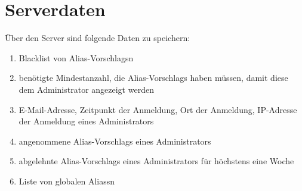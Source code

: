 \section{Serverdaten}

Über den Server sind folgende Daten zu speichern:
\begin{enumerate}[label=\textbf{/D\arabic*0/}, align=left]
	\setcounter{enumi}{\value{user_data_end}}
	\item Blacklist von \Glspl{Alias-Vorschlag}n
	\item benötigte Mindestanzahl, die \Glspl{Alias-Vorschlag} haben müssen, damit diese dem Administrator angezeigt werden
	\item E-Mail-Adresse, Zeitpunkt der Anmeldung, Ort der Anmeldung, IP-Adresse der Anmeldung eines Administrators
	\item angenommene \Glspl{Alias-Vorschlag} eines Administrators
	\item abgelehnte \Glspl{Alias-Vorschlag} eines Administrators für höchstens eine Woche
	\item Liste von globalen \Glspl{Alias}n
\end{enumerate}